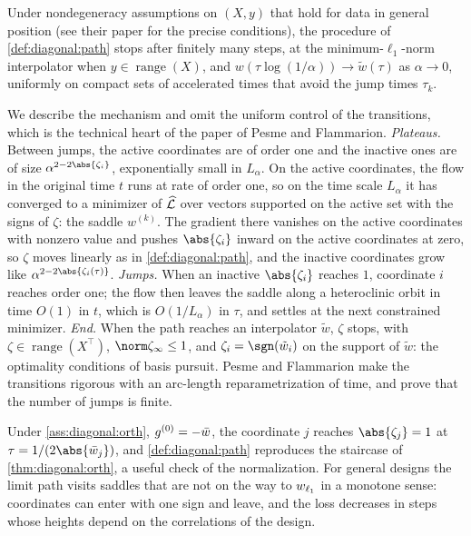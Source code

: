 \begin{refsection}
\begin{theorem}\label{thm:diagonal:saddles}
Under nondegeneracy assumptions on $(X,y)$ that hold for data in general position (see their paper for the precise conditions), the procedure of \cref{def:diagonal:path} stops after finitely many steps, at the minimum-$\ell_1$-norm interpolator when $y\in\operatorname{range}(X)$, and $w(\tau\log(1/\alpha))\to\tilde w(\tau)$ as $\alpha\to0$, uniformly on compact sets of accelerated times that avoid the jump times $\tau_k$.
\end{theorem}

\begin{proofsketch}
We describe the mechanism and omit the uniform control of the transitions, which is the technical heart of the paper of Pesme and Flammarion. \emph{Plateaus.} Between jumps, the active coordinates are of order one and the inactive ones are of size $\alpha^{2-2\abs{\zeta_i}}$, exponentially small in $L_\alpha$. On the active coordinates, the flow in the original time $t$ runs at rate of order one, so on the time scale $L_\alpha$ it has converged to a minimizer of $\widehat{\mathcal{L}}$ over vectors supported on the active set with the signs of $\zeta$: the saddle $w^{(k)}$. The gradient there vanishes on the active coordinates with nonzero value and pushes $\abs{\zeta_i}$ inward on the active coordinates at zero, so $\zeta$ moves linearly as in \cref{def:diagonal:path}, and the inactive coordinates grow like $\alpha^{2-2\abs{\zeta_i(\tau)}}$. \emph{Jumps.} When an inactive $\abs{\zeta_i}$ reaches $1$, coordinate $i$ reaches order one; the flow then leaves the saddle along a heteroclinic orbit in time $O(1)$ in $t$, which is $O(1/L_\alpha)$ in $\tau$, and settles at the next constrained minimizer. \emph{End.} When the path reaches an interpolator $\tilde w$, $\zeta$ stops, with $\zeta\in\operatorname{range}(X^\top)$, $\norm\zeta_\infty\le1$, and $\zeta_i=\sgn(\tilde w_i)$ on the support of $\tilde w$: the optimality conditions of basis pursuit. Pesme and Flammarion make the transitions rigorous with an arc-length reparametrization of time, and prove that the number of jumps is finite.
\end{proofsketch}

Under \cref{ass:diagonal:orth}, $g^{(0)}=-\bar w$, the coordinate $j$ reaches $\abs{\zeta_j}=1$ at $\tau=1/(2\abs{\diagbar_j})$, and \cref{def:diagonal:path} reproduces the staircase of \cref{thm:diagonal:orth}, a useful check of the normalization. For general designs the limit path visits saddles that are not on the way to $w_{\ell_{1}}$ in a monotone sense: coordinates can enter with one sign and leave, and the loss decreases in steps whose heights depend on the correlations of the design.


\end{refsection}
